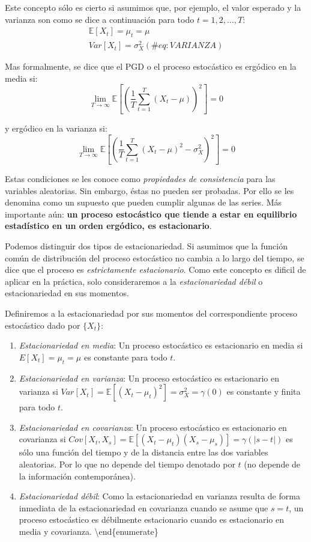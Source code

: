 \documentclass[
  a4paper,
]{article}
\begin{document}
Este concepto sólo es cierto si asumimos que, por ejemplo, el valor
esperado y la varianza son como se dice a continuación para todo
\(t = 1, 2, \ldots, T\): \begin{eqnarray}
    \mathbb{E}[X_t] = \mu_t = \mu \\
    \label{MEDIA}
    Var[X_t] = \sigma^2_X
    (\#eq:VARIANZA)
\end{eqnarray}

Mas formalmente, se dice que el PGD o el proceso estocástico es ergódico
en la media si: \[
    \displaystyle\lim_{T \to \infty}{\mathbb{E} \left[ \left( \frac{1}{T} \sum^{T}_{t = 1} (X_t - \mu) \right) ^2 \right]} = 0
\]

y ergódico en la varianza si: \[
    \displaystyle\lim_{T \to \infty}{\mathbb{E} \left[ \left( \frac{1}{T} \sum^{T}_{t = 1} (X_t - \mu) ^2 - \sigma^2_X \right) ^2 \right]} = 0
\]

Estas condiciones se les conoce como \emph{propiedades de consistencia}
para las variables aleatorias. Sin embargo, éstas no pueden ser
probadas. Por ello se les denomina como un supuesto que pueden cumplir
algunas de las series. Más importante aún: \textbf{un proceso
estocástico que tiende a estar en equilibrio estadístico en un orden
ergódico, es estacionario}.

Podemos distinguir dos tipos de estacionariedad. Si asumimos que la
función común de distribución del proceso estocástico no cambia a lo
largo del tiempo, se dice que el proceso es \emph{estrictamente
estacionario}. Como este concepto es dificil de aplicar en la práctica,
solo consideraremos a la \emph{estacionariedad débil} o estacionariedad
en sus momentos.

Definiremos a la estacionariedad por sus momentos del correspondiente
proceso estocástico dado por \(\{X_t\}\):

\begin{enumerate}
\def\labelenumi{\arabic{enumi})}
\item
  \emph{Estacionariedad en media}: Un proceso estocástico es
  estacionario en media si \(E[X_t] = \mu_t = \mu\) es constante para
  todo \(t\).
\item
  \emph{Estacionariedad en varianza}: Un proceso estocástico es
  estacionario en varianza si
  \(Var[X_t] = \mathbb{E}[(X_t - \mu_t)^2] = \sigma^2_X = \gamma(0)\) es
  constante y finita para todo \(t\).
\item
  \emph{Estacionariedad en covarianza}: Un proceso estocástico es
  estacionario en covarianza si
  \(Cov[X_t,X_s] = \mathbb{E}[(X_t - \mu_t)(X_s - \mu_s)] = \gamma(|s-t|)\)
  es sólo una función del tiempo y de la distancia entre las dos
  variables aleatorias. Por lo que no depende del tiempo denotado por
  \(t\) (no depende de la información contemporánea).
\item
  \emph{Estacionariedad débil}: Como la estacionariedad en varianza
  resulta de forma inmediata de la estacionariedad en covarianza cuando
  se asume que \(s = t\), un proceso estocástico es débilmente
  estacionario cuando es estacionario en media y covarianza.
  \textbackslash end\{enumerate\}
\end{enumerate}
\end{document}
